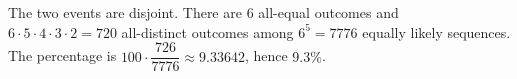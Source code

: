 The two events are disjoint. There are $ 6 $ all-equal outcomes and $ 6\cdot5\cdot4\cdot3\cdot2=720 $ all-distinct outcomes among $ 6^5=7776 $ equally likely sequences. The percentage is $ 100\cdot\dfrac{726}{7776}\approx9.33642 $, hence $\boxed{9.3\%}$.
